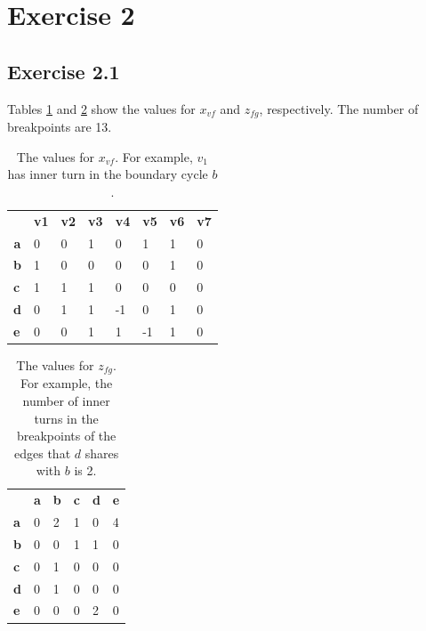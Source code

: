 \documentclass[12pt]{article}
\begin{document}
\section*{Exercise 2}
\subsection*{Exercise 2.1}

  Tables \ref{table:values_xvf} and \ref{table:values_zfg} show the values for $x_{vf}$ and $z_{fg}$, respectively. The number of breakpoints are 13.

  \begin{table}[h]
    \centering
    \begin{tabular}{llllllll}
                                    & \textbf{v1} & \textbf{v2} & \textbf{v3} & \textbf{v4} & \textbf{v5} & \textbf{v6} & \textbf{v7} \\ \cline{2-8}
    \multicolumn{1}{c|}{\textbf{a}} & 0           & 0           & 1           & 0           & 1           & 1           & 0           \\
    \multicolumn{1}{l|}{\textbf{b}} & 1           & 0           & 0           & 0           & 0           & 1           & 0           \\
    \multicolumn{1}{l|}{\textbf{c}} & 1           & 1           & 1           & 0           & 0           & 0           & 0           \\
    \multicolumn{1}{l|}{\textbf{d}} & 0           & 1           & 1           & -1          & 0           & 1           & 0           \\
    \multicolumn{1}{l|}{\textbf{e}} & 0           & 0           & 1           & 1           & -1          & 1           & 0
    \end{tabular}
    \caption{The values for $x_{vf}$. For example, $v_1$ has inner turn in the boundary cycle $b$.}
    \label{table:values_xvf}
  \end{table}

  \begin{table}[h]
    \centering
    \begin{tabular}{llllll}
                                    & \textbf{a} & \textbf{b} & \textbf{c} & \textbf{d} & \textbf{e} \\ \cline{2-6}
    \multicolumn{1}{l|}{\textbf{a}} & 0          & 2          & 1          & 0          & 4          \\
    \multicolumn{1}{l|}{\textbf{b}} & 0          & 0          & 1          & 1          & 0          \\
    \multicolumn{1}{l|}{\textbf{c}} & 0          & 1          & 0          & 0          & 0          \\
    \multicolumn{1}{l|}{\textbf{d}} & 0          & 1          & 0          & 0          & 0          \\
    \multicolumn{1}{l|}{\textbf{e}} & 0          & 0          & 0          & 2          & 0
    \end{tabular}
    \caption{The values for $z_{fg}$. For example, the number of inner turns in the breakpoints of the edges that $d$ shares with $b$ is 2.}
    \label{table:values_zfg}
  \end{table}
\end{document}

